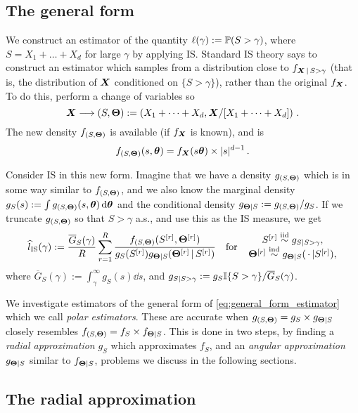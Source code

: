 \subsection{The general form}

We construct an estimator of the quantity $\ell(\gamma) := \operatorname{{\mathbb P}}(S > \gamma)$, where $S = X_1 + \dots + X_d$ for large $\gamma$ by applying IS.
Standard IS theory says to construct an estimator which samples from a distribution close to $f_{\bm{X} \,|\, S>\gamma}$ (that is, the distribution of $\bm{X}$ conditioned on $\{ S>\gamma \}$), rather than the original $f_{\bm{X}}$. To do this, perform a change of variables so
\[ \bm{X} \longrightarrow (S,\bm{\Theta}) := \left(X_1+\dots+X_d, \bm{X} / [X_1+\dots+X_d] \right) \,. \]
The new density $f_{(S,\bm{\Theta})}$ is available (if $f_{\bm{X}}$ is known), and is
\[
f_{(S,\bm{\Theta})}(s,\bm{\theta}) = f_{\bm{X}}(s\bm{\theta}) \times |s|^{d-1}\,.
\]

Consider IS in this new form. Imagine that we have a density $g_{(S,\bm{\Theta})}$ which is in some way similar to $f_{(S,\bm{\Theta})}$, and we also know the marginal density $g_S(s) := \int g_{(S,\bm{\Theta})}(s,\bm{\theta}) \mathop{}\!\mathrm{d} \bm{\theta}$ and the conditional density $g_{\bm{\Theta} \mid S}:=g_{(S,\bm{\Theta})}/g_S$. If we truncate $g_{(S,\bm{\Theta})}$ so that $S>\gamma$ a.s., and use this as the IS measure, we get
\begin{equation} \label{eq:general_form_estimator}
\hat{l}_{\mathrm{IS}}(\gamma) := \frac{\overline{G}_S(\gamma)}{R} \sum_{r=1}^R \frac{ f_{(S,\bfTheta)}(S^{[r]}, \bfTheta^{[r]}) }{ g_S( S^{[r]} ) g_{\bfTheta \mid S}(\bfTheta^{[r]}\,|\, S^{[r]})}
\quad \text{for} \quad
\genfrac{}{}{0pt}{}{ S^{[r]} \iidDist g_{S \mid S>\gamma}, }{ \bfTheta^{[r]} \indDist g_{\bfTheta \mid S}( \,\cdot\, | S^{[r]}), }
\end{equation}
where $\overline{G}_S(\gamma) :=  \int_{\gamma}^\infty g_S(s) \dd s$, and $g_{S \mid S>\gamma}:=g_S \mathbb{I}\{  S>\gamma  \} / \overline{G}_S(\gamma)$.

We investigate estimators of the general form of \eqref{eq:general_form_estimator} which we call \emph{polar estimators}.
These are accurate when $g_{(S,\bm{\Theta})}= g_S \times g_{\bm{\Theta} \mid S}$ closely resembles $f_{(S,\bm{\Theta})}=f_S \times f_{\bm{\Theta} \mid S}$.
This is done in two steps, by finding a \emph{radial approximation} $g_S$ which approximates $f_S$, and an \emph{angular approximation} $g_{\bm{\Theta} \mid S}$ similar to $f_{\bm{\Theta} \mid S}$, problems we discuss in the following sections.


\subsection{The radial approximation}

